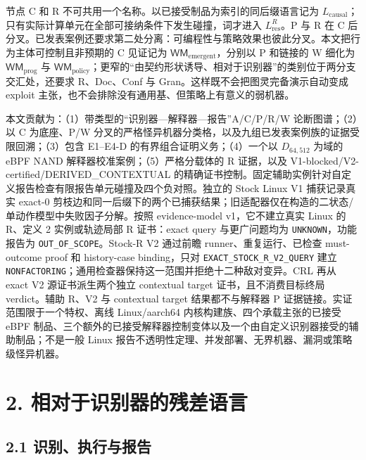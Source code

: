 \documentclass[
  11pt,
  a4paper,
]{ctexart}
\begin{document}
节点 C 和 R 不可共用一个名称。以已接受制品为索引的同后缀语言记为
\(L_{\mathrm{causal}}\)；只有实际计算单元在全部可接纳条件下发生碰撞，词才进入
\(L_{\mathrm{res}}^R\)。P 与 R 在 C
后分叉。已发表案例还要求第二处分离：可编程性与策略效果也彼此分叉。本文把行为主体可控制且非预期的
C 见证记为 \(\mathsf{WM}_{\mathrm{emergent}}\)，分别以 P 和链接的 W
细化为 \(\mathsf{WM}_{\mathrm{prog}}\) 与
\(\mathsf{WM}_{\mathrm{policy}}\)；更窄的``由契约形状诱导、相对于识别器''的类别位于两分支交汇处，还要求
R、Doc、Conf 与 Gran。这样既不会把图灵完备演示自动变成 exploit
主张，也不会排除没有通用基、但策略上有意义的弱机器。

本文贡献为：（1）带类型的``识别器---解释器---报告''A/C/P/R/W
论断图谱；（2）以 C 为底座、P/W
分叉的严格怪异机器分类格，以及九组已发表案例族的证据受限回溯；（3）包含
E1--E4-D 的有界组合证明义务；（4）一个以 \(D_{64,512}\) 为域的 eBPF NAND
解释器校准案例；（5）严格分载体的 R 证据，以及
V1-blocked/V2-certified/DERIVED\_CONTEXTUAL
的精确证书控制。固定辅助实例针对自定义报告检查有限报告单元碰撞及四个负对照。独立的
Stock Linux V1 捕获记录真实 exact-0
剪枝边和同一后缀下的两个已捕获结果；旧适配器仅在构造的二状态/单动作模型中失败因子分解。按照
evidence-model v1，它不建立真实 Linux 的 R、定义 2 实例或轨迹局部 R
证书：exact query 与更广问题均为 \texttt{UNKNOWN}，功能报告为
\texttt{OUT\_OF\_SCOPE}。Stock-R V2 通过前瞻 runner、重复运行、已检查
must-outcome proof 和 history-case binding，只对
\texttt{EXACT\_STOCK\_R\_V2\_QUERY} 建立
\texttt{NONFACTORING}；通用检查器保持这一范围并拒绝十二种敌对变异。CRL
再从 exact V2 源证书派生两个独立 contextual target
证书，且不消费目标终局 verdict。辅助 R、V2 与 contextual target
结果都不与解释器 P 证据链接。实证范围限于一个特权、离线 Linux/aarch64
内核构建族、四个承载主张的已接受 eBPF
制品、三个额外的已接受解释器控制变体以及一个由自定义识别器接受的辅助制品；不是一般
Linux 报告不透明性定理、并发部署、无界机器、漏洞或策略级怪异机器。

\hypertarget{2-ux76f8ux5bf9ux4e8eux8bc6ux522bux5668ux7684ux6b8bux5deeux8bedux8a00}{%
\section{2.
相对于识别器的残差语言}\label{2-ux76f8ux5bf9ux4e8eux8bc6ux522bux5668ux7684ux6b8bux5deeux8bedux8a00}}

\hypertarget{21-ux8bc6ux522bux6267ux884cux4e0eux62a5ux544a}{%
\subsection{2.1
识别、执行与报告}\label{21-ux8bc6ux522bux6267ux884cux4e0eux62a5ux544a}}
\end{document}
